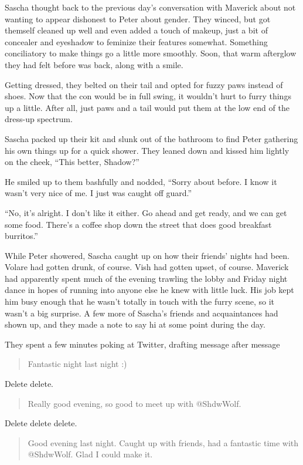 Sascha thought back to the previous day's conversation with Maverick about not wanting to appear dishonest to Peter about gender. They winced, but got themself cleaned up well and even added a touch of makeup, just a bit of concealer and eyeshadow to feminize their features somewhat. Something conciliatory to make things go a little more smoothly. Soon, that warm afterglow they had felt before was back, along with a smile.

Getting dressed, they belted on their tail and opted for fuzzy paws instead of shoes. Now that the con would be in full swing, it wouldn't hurt to furry things up a little. After all, just paws and a tail would put them at the low end of the dress-up spectrum.

Sascha packed up their kit and slunk out of the bathroom to find Peter gathering his own things up for a quick shower. They leaned down and kissed him lightly on the cheek, ``This better, Shadow?''

He smiled up to them bashfully and nodded, ``Sorry about before. I know it wasn't very nice of me. I just was caught off guard.''

``No, it's alright. I don't like it either. Go ahead and get ready, and we can get some food. There's a coffee shop down the street that does good breakfast burritos.''

While Peter showered, Sascha caught up on how their friends' nights had been. Volare had gotten drunk, of course. Vish had gotten upset, of course. Maverick had apparently spent much of the evening trawling the lobby and Friday night dance in hopes of running into anyone else he knew with little luck. His job kept him busy enough that he wasn't totally in touch with the furry scene, so it wasn't a big surprise. A few more of Sascha's friends and acquaintances had shown up, and they made a note to say hi at some point during the day.

They spent a few minutes poking at Twitter, drafting message after message

\begin{quote}
  Fantastic night last night :)
\end{quote}

Delete delete.

\begin{quote}
  Really good evening, so good to meet up with @ShdwWolf.
\end{quote}

Delete delete delete.

\begin{quote}
  Good evening last night. Caught up with friends, had a fantastic time with @ShdwWolf. Glad I could make it.
\end{quote}

